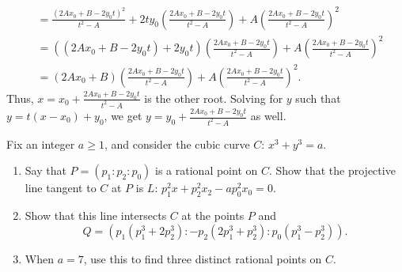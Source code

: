 \documentclass[12 pt, letterpaper]{hmcpset}
\begin{document}
\begin{solution}
\begin{enumerate}
\[\begin{split}
					& = \frac{(2 A x_{0} + B - 2 y_{0} t)^{2}}{t^{2} - A} + 2t y_{0} \left ( \frac{2A x_{0} + B - 2 y_{0} t}{t^{2} - A} \right ) + A \left ( \frac{2 A x_{0} + B - 2 y_{0} t}{t^{2} - A} \right )^{2} \\
										     & = ((2A x_{0} + B - 2 y_{0} t) + 2 y_{0} t) \left ( \frac{2 A x_{0} + B - 2 y_{0} t}{t^{2} - A} \right ) + A \left ( \frac{2 A x_{0} + B - 2 y_{0} t}{t^{2} - A} \right )^{2} \\
										     & = (2 A x_{0} + B) \left ( \frac{2 A x_{0} + B - 2 y_{0} t}{t^{2} - A} \right ) + A \left ( \frac{2 A x_{0} + B - 2 y_{0} t}{t^{2} - A} \right )^{2}.
				\end{split}
			\]
			Thus, $x = x_{0} + \frac{2 A x_{0} + B - 2 y_{0} t}{t^{2} - A}$ is the other root. Solving for $y$ such that $y = t(x - x_{0}) + y_{0}$, we get $y = y_{0} + \frac{2 A x_{0} + B - 2 y_{0} t}{t^{2} - A}$ as well.
	\end{enumerate}
\end{solution}

\pagebreak

\begin{problem}[2]
	Fix an integer $a \ge 1$, and consider the cubic curve $C$: $x^{3} + y^{3} = a$.
	\begin{enumerate}
		\item Say that $P = (p_{1} : p_{2} : p_{0})$ is a rational point on $C$. Show that the projective line tangent to $C$ at $P$ is $L$: $p_{1}^{2} x + p_{2}^{2} x_{2} - a p_{0}^{2} x_{0} = 0$.
		\item Show that this line intersects $C$ at the points $P$ and
			\[
				Q = \left ( p_{1} (p_{1}^{3} + 2 p_{2}^{3}) : -p_{2} (2 p_{1}^{3} + p_{2}^{3}) : p_{0}(p_{1}^{3} - p_{2}^{3}) \right ).
			\]
		\item When $a = 7$, use this to find three distinct rational points on $C$.
	\end{enumerate}
\end{problem}
\end{document}
